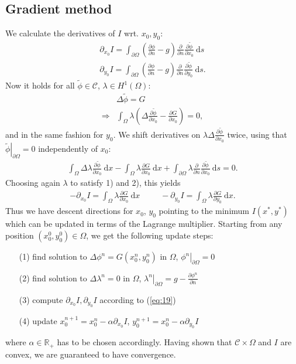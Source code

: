 \subsection{Gradient method}
We calculate the derivatives of $I$ wrt. $x_0,y_0$:
\begin{align}\label{eq:14}
	\partial_{x_0} I = \int_{\partial\Omega}
		\left(
			\frac{\partial\phi}{\partial n} - g
		\right)
		\frac{\partial}{\partial n}\frac{\partial\widetilde{\phi}}{\partial x_0}
	\:\mathrm{d}s\\
		\partial_{y_0} I = \int_{\partial\Omega}
		\left(
			\frac{\partial\phi}{\partial n} - g
		\right)
		\frac{\partial}{\partial n}\frac{\partial\widetilde{\phi}}{\partial y_0}
	\:\mathrm{d}s. \label{eq:15}
\end{align}
Now it holds for all $\widetilde{\phi}\in\mathcal{C}$, $\lambda\in H^1(\Omega)$:
\begin{align}\label{eq:16}
	&\Delta\widetilde{\phi} = G\\
	\Rightarrow &\int_\Omega \lambda
		\left(\Delta\frac{\partial\widetilde{\phi}}{\partial x_0}
		-\frac{\partial G}{\partial x_0}\right)
	=0,\label{eq:17}
\end{align}
and in the same fashion for $y_0$. We shift derivatives on 
$\lambda \Delta\frac{\partial\widetilde{\phi}}{\partial x_0}$
twice, using that $\left. \widetilde{\phi}\right|_{\partial\Omega}=0$ independently of $x_0$:
\begin{align}\label{eq:18}
	\int_{\Omega}\Delta\lambda \frac{\partial\widetilde{\phi}}{\partial x_0}
	\:\mathrm{d}x
	-\int_\Omega \lambda \frac{\partial G}{\partial x_0}
	\:\mathrm{d}x
	+\int_{\partial\Omega} \lambda 
		\frac{\partial}{\partial n}\frac{\partial\widetilde{\phi}}{\partial x_0}
	\:\mathrm{d}s
	=0.
\end{align}
Choosing again $\lambda$ to satisfy 1) and 2), this yields
\begin{align}\label{eq:19}
	-\partial_{x_0}I = \int_\Omega \lambda \frac{\partial G}{\partial x_0}\:\mathrm{d}x
	\hspace{30pt}
	-\partial_{y_0}I = \int_\Omega \lambda \frac{\partial G}{\partial y_0}\:\mathrm{d}x.
\end{align}
Thus we have descent directions for $x_0$, $y_0$ pointing to the minimum $I(x^*,y^*)$ which can be updated in terms of the Lagrange multiplier. Starting from any position $(x_0^0,y_0^0)\in\Omega$, we get the following update steps:
\begin{itemize}
	\item[(1)] find solution to $\Delta\phi^n = G(x_0^n,y_0^n)$ in $\Omega$, $\left. \phi^n\right|_{\partial\Omega}=0$
	\item[(2)] find solution to $\Delta\lambda^n = 0$ in $\Omega$, $\left. \lambda^n\right|_{\partial\Omega}=g-\frac{\partial \phi^n}{\partial n}$
	\item[(3)] compute $\partial_{x_0}I, \partial_{y_0}I$ according to (\ref{eq:19})
	\item[(4)] update $x_0^{n+1}=x_0^n - \alpha\partial_{x_0}I$, $y_0^{n+1}=x_0^n - \alpha\partial_{y_0}I$
\end{itemize}
where $\alpha\in\mathbb R_+$ has to be chosen accordingly. Having shown that $\mathcal{C}\times\Omega$ and $I$ are convex, we are guaranteed to have convergence.